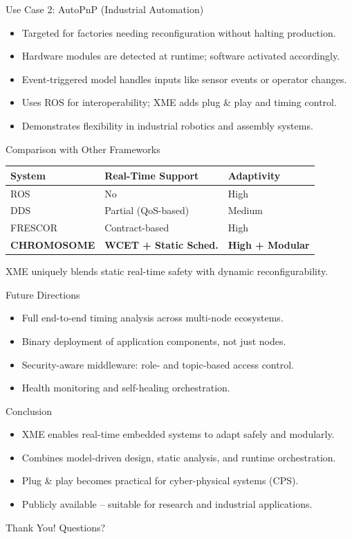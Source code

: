 \documentclass{beamer}
\begin{document}
\begin{frame}{Use Case 2: AutoPnP (Industrial Automation)}
  \begin{itemize}
    \item Targeted for factories needing reconfiguration without halting production.
    \item Hardware modules are detected at runtime; software activated accordingly.
    \item Event-triggered model handles inputs like sensor events or operator changes.
    \item Uses ROS for interoperability; XME adds plug \& play and timing control.
    \item Demonstrates flexibility in industrial robotics and assembly systems.
  \end{itemize}
\end{frame}

\begin{frame}{Comparison with Other Frameworks}
  \begin{tabular}{l|l|l}
    \textbf{System} & \textbf{Real-Time Support} & \textbf{Adaptivity} \\
    \hline
    ROS & No & High \\
    DDS & Partial (QoS-based) & Medium \\
    FRESCOR & Contract-based & High \\
    \textbf{CHROMOSOME} & \textbf{WCET + Static Sched.} & \textbf{High + Modular}
  \end{tabular}
  \vspace{1em}
  \smallskip
  XME uniquely blends static real-time safety with dynamic reconfigurability.
\end{frame}

\begin{frame}{Future Directions}
  \begin{itemize}
    \item Full end-to-end timing analysis across multi-node ecosystems.
    \item Binary deployment of application components, not just nodes.
    \item Security-aware middleware: role- and topic-based access control.
    \item Health monitoring and self-healing orchestration.
  \end{itemize}
\end{frame}

\begin{frame}{Conclusion}
  \begin{itemize}
    \item XME enables real-time embedded systems to adapt safely and modularly.
    \item Combines model-driven design, static analysis, and runtime orchestration.
    \item Plug \& play becomes practical for cyber-physical systems (CPS).
    \item Publicly available -- suitable for research and industrial applications.
  \end{itemize}
\end{frame}

\begin{frame}{Thank You!}
  \centering
  \Huge Questions?
\end{frame}
\end{document}

